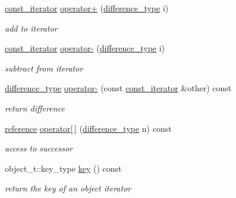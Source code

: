 \begin{DoxyCompactItemize}
\hyperlink{classnlohmann_1_1basic__json_1_1const__iterator}{const\-\_\-iterator} \hyperlink{classnlohmann_1_1basic__json_1_1const__iterator_a7a80257f2303210b0a5d056fc0b30b40}{operator+} (\hyperlink{classnlohmann_1_1basic__json_1_1const__iterator_a49d7c3e9ef3280df03052cce988b792f}{difference\-\_\-type} i)
\begin{DoxyCompactList}\small\item\em add to iterator \end{DoxyCompactList}\item 
\hyperlink{classnlohmann_1_1basic__json_1_1const__iterator}{const\-\_\-iterator} \hyperlink{classnlohmann_1_1basic__json_1_1const__iterator_abc4552ba2fe39e7901a83dd6d4dec151}{operator-\/} (\hyperlink{classnlohmann_1_1basic__json_1_1const__iterator_a49d7c3e9ef3280df03052cce988b792f}{difference\-\_\-type} i)
\begin{DoxyCompactList}\small\item\em subtract from iterator \end{DoxyCompactList}\item 
\hyperlink{classnlohmann_1_1basic__json_1_1const__iterator_a49d7c3e9ef3280df03052cce988b792f}{difference\-\_\-type} \hyperlink{classnlohmann_1_1basic__json_1_1const__iterator_a5e4d98a8f95e2eccde8cd48c19efa196}{operator-\/} (const \hyperlink{classnlohmann_1_1basic__json_1_1const__iterator}{const\-\_\-iterator} \&other) const 
\begin{DoxyCompactList}\small\item\em return difference \end{DoxyCompactList}\item 
\hyperlink{classnlohmann_1_1basic__json_1_1const__iterator_aefd248cac6493eed1e6ff53ba6a63eb2}{reference} \hyperlink{classnlohmann_1_1basic__json_1_1const__iterator_a7bd530bfbbc58ac77308c087120c21fa}{operator\mbox{[}$\,$\mbox{]}} (\hyperlink{classnlohmann_1_1basic__json_1_1const__iterator_a49d7c3e9ef3280df03052cce988b792f}{difference\-\_\-type} n) const 
\begin{DoxyCompactList}\small\item\em access to successor \end{DoxyCompactList}\item 
object\-\_\-t\-::key\-\_\-type \hyperlink{classnlohmann_1_1basic__json_1_1const__iterator_a5d4320e24fcb7df041ff2c95d976dba0}{key} () const 
\begin{DoxyCompactList}\small\item\em return the key of an object iterator \end{DoxyCompactList}\item 

\end{DoxyCompactItemize}
